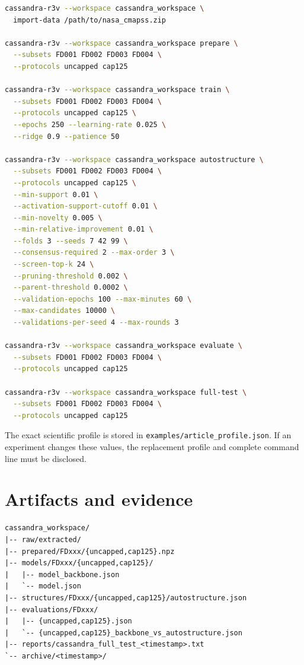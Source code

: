 \documentclass[11pt,a4paper]{article}
\begin{document}
\begin{lstlisting}[language=bash]
cassandra-r3v --workspace cassandra_workspace \
  import-data /path/to/nasa_cmapss.zip

cassandra-r3v --workspace cassandra_workspace prepare \
  --subsets FD001 FD002 FD003 FD004 \
  --protocols uncapped cap125

cassandra-r3v --workspace cassandra_workspace train \
  --subsets FD001 FD002 FD003 FD004 \
  --protocols uncapped cap125 \
  --epochs 250 --learning-rate 0.025 \
  --ridge 0.9 --patience 50

cassandra-r3v --workspace cassandra_workspace autostructure \
  --subsets FD001 FD002 FD003 FD004 \
  --protocols uncapped cap125 \
  --min-support 0.01 \
  --activation-support-cutoff 0.01 \
  --min-novelty 0.005 \
  --min-relative-improvement 0.01 \
  --folds 3 --seeds 7 42 99 \
  --consensus-required 2 --max-order 3 \
  --screen-top-k 24 \
  --pruning-threshold 0.002 \
  --parent-threshold 0.0002 \
  --validation-epochs 100 --max-minutes 60 \
  --max-candidates 10000 \
  --validations-per-seed 4 --max-rounds 3

cassandra-r3v --workspace cassandra_workspace evaluate \
  --subsets FD001 FD002 FD003 FD004 \
  --protocols uncapped cap125

cassandra-r3v --workspace cassandra_workspace full-test \
  --subsets FD001 FD002 FD003 FD004 \
  --protocols uncapped cap125
\end{lstlisting}

The exact scientific profile is stored in
\texttt{examples/article\_profile.json}. If an experiment changes these values,
the replacement profile and complete command line must be disclosed.

\clearpage
\section{Artifacts and evidence}

\begin{lstlisting}
cassandra_workspace/
|-- raw/extracted/
|-- prepared/FDxxx/{uncapped,cap125}.npz
|-- models/FDxxx/{uncapped,cap125}/
|   |-- model_backbone.json
|   `-- model.json
|-- structures/FDxxx/{uncapped,cap125}/autostructure.json
|-- evaluations/FDxxx/
|   |-- {uncapped,cap125}.json
|   `-- {uncapped,cap125}_backbone_vs_autostructure.json
|-- reports/cassandra_full_test_<timestamp>.txt
`-- archive/<timestamp>/
\end{lstlisting}
\end{document}
